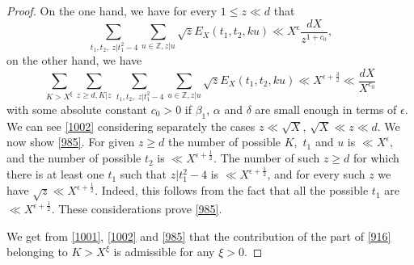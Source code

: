 \documentclass[12pt]{amsart}
\theoremstyle{definition}
\numberwithin{equation}{section}
\begin{document}
\begin{proof}
On the one hand, we have for every $1\le z\ll d$ that
\begin{equation}\sum_{\,t_1,t_2,\;z|t_1^2-4}\sum_{u\in\mathbb{Z},
z|u}\sqrt {z}E_X\left(t_1,t_2,ku\right)\ll X^{\epsilon}\frac {dX}{
z^{1+c_0}},\label{1002}\end{equation}
on the other hand, we have
\begin{equation}\sum_{K>X^{\xi}}\sum_{z\ge d,K|z}\sum_{\,t_1,t_2,\;
z|t_1^2-4}\sum_{u\in\mathbb{Z},z|u}\sqrt {z}E_X\left(t_1,t_2,ku\right
)\ll X^{\epsilon +\frac 32}\ll\frac {dX}{X^{c_0}}\label{985}\end{equation}
with some absolute constant $c_0>0$ if $\beta_1$, $\alpha$ and $\delta$ are
small enough in terms of $\epsilon$. We can see \eqref{1002} considering
separately the cases $z\ll\sqrt {X}$, $\sqrt {X}\ll z\ll d$. We now show
\eqref{985}. For given $z\ge d$ the number of possible $K,$ $t_1$ and $
u$ is $\ll X^{\epsilon}$,
and the number of possible $t_2$ is $\ll X^{\epsilon +\frac 12}$. The
number of such $z\ge d$ for which there is at least one $t_1$
such that $z|t_1^2-4$ is $\ll X^{\epsilon +\frac 12}$, and for every such $
z$ we
have $\sqrt {z}\ll X^{\epsilon +\frac 12}$. Indeed, this follows from the fact that
all the possible $t_1$ are $\ll X^{\epsilon +\frac 12}$. These considerations
prove \eqref{985}.

We get from \eqref{1001}, \eqref{1002} and \eqref{985} that the contribution of the part of \eqref{916}
belonging to $K>X^{\xi}$ is admissible for any $\xi >0$.


\end{proof}
\end{document}
